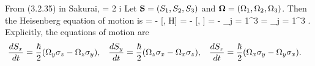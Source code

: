 \begin{solution}
	From (3.2.35) in Sakurai,
	\beq
		[\sigi, \sigj] = 2 i \lct \sigk
	\eeq
	Let $\mathbf{S} = (S_1, S_2, S_3)$ and $\boldsymbol{\Omega} = (\Omega_1, \Omega_2, \Omega_3)$.  Then the Heisenberg equation of motion is
	\beq
		 = - [\Si, H] = - [\sigi, \Ods] = - \sum_{j = 1}^3 \Omj [\sigi, \sigj] =  \sum_{j = 1}^3 \Omj \lct \sigk.
	\eeq
	Explicitly, the equations of motion are
	\begin{align*}
		\dv{S_x}{t} &= \frac{\hbar}{2} (\Omega_y \sigma_z - \Omega_z \sigma_y), &
		\dv{S_y}{t} &= \frac{\hbar}{2} (\Omega_z \sigma_x - \Omega_x \sigma_z), &
		\dv{S_z}{t} &= \frac{\hbar}{2} (\Omega_x \sigma_y - \Omega_y \sigma_x).
	\end{align*}
\end{solution}